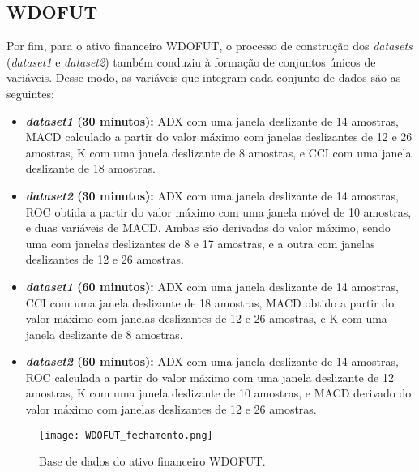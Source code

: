\subsection{WDOFUT}
Por fim,  para o ativo financeiro WDOFUT, o processo de construção dos \textit{datasets} (\textit{dataset1} e \textit{dataset2}) também conduziu à formação de conjuntos únicos de variáveis. Desse modo, as variáveis que integram cada conjunto de dados são as seguintes:
\begin{itemize}
	\item \textbf{\textit{dataset1} (30 minutos):} \ac{ADX} com uma janela deslizante de 14 amostras, \ac{MACD} calculado a partir do valor máximo com janelas deslizantes de 12 e 26 amostras, \ac{K} com uma janela deslizante de 8 amostras, e \ac{CCI} com uma janela deslizante de 18 amostras.
	
	\item \textbf{\textit{dataset2} (30 minutos):} \ac{ADX} com uma janela deslizante de 14 amostras, \ac{ROC} obtida a partir do valor máximo com uma janela móvel de 10 amostras, e duas variáveis de \ac{MACD}. Ambas são derivadas do valor máximo, sendo uma com janelas deslizantes de 8 e 17 amostras, e a outra com janelas deslizantes de 12 e 26 amostras.
	
	\item \textbf{\textit{dataset1} (60 minutos):} \ac{ADX} com uma janela deslizante de 14 amostras, \ac{CCI} com uma janela deslizante de 18 amostras, \ac{MACD} obtido a partir do valor máximo com janelas deslizantes de 12 e 26 amostras, e \ac{K} com uma janela deslizante de 8 amostras.
	
	\item \textbf{\textit{dataset2} (60 minutos):} \ac{ADX} com uma janela deslizante de 14 amostras, \ac{ROC} calculada a partir do valor máximo com uma janela deslizante de 12 amostras, \ac{K} com uma janela deslizante de 10 amostras, e \ac{MACD} derivado do valor máximo com janelas deslizantes de 12 e 26 amostras.
\end{itemize}

\begin{figure}[htbp]
	\caption{Base de dados do ativo financeiro WDOFUT.}
	\centering
	\texttt{[image: WDOFUT\_fechamento.png]} 
	\label{fig:WDOFUT_fechamento}
\end{figure}


